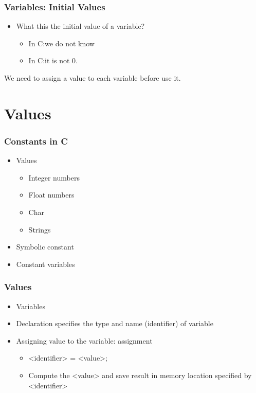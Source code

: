 \documentclass{../c-lecture}
\begin{document}
\begin{frame}
  \frametitle{Variables: Initial Values}
  \begin{itemize}
    \item What this the initial value of a variable?
    \begin{itemize}
      \item In C:\@ we do not know
      \item In C:\@ it is not 0.
    \end{itemize}
  \end{itemize}
  \begin{block}
  We need to assign a value to each variable before use it.
  \end{block}
\end{frame}

\section{Values}

\begin{frame}
  \frametitle{Constants in C}
  \begin{itemize}
    \item Values
    \begin{itemize}
      \item Integer numbers
      \item Float numbers
      \item Char
      \item Strings
    \end{itemize}
    \item Symbolic constant
    \item Constant variables
  \end{itemize}
\end{frame}

\begin{frame}
  \frametitle{Values}
  \begin{itemize}
    \item Variables
    \item Declaration specifies the type and name (identifier) of variable
    \item
      Assigning value to the variable:
      {\color{Orange} assignment}

    \begin{itemize}
      \item <identifier> = <value>;
      \item
        Compute the <value> and save result in memory location specified
        by <identifier>

    \end{itemize}
  \end{itemize}
\end{frame}
\end{document}

